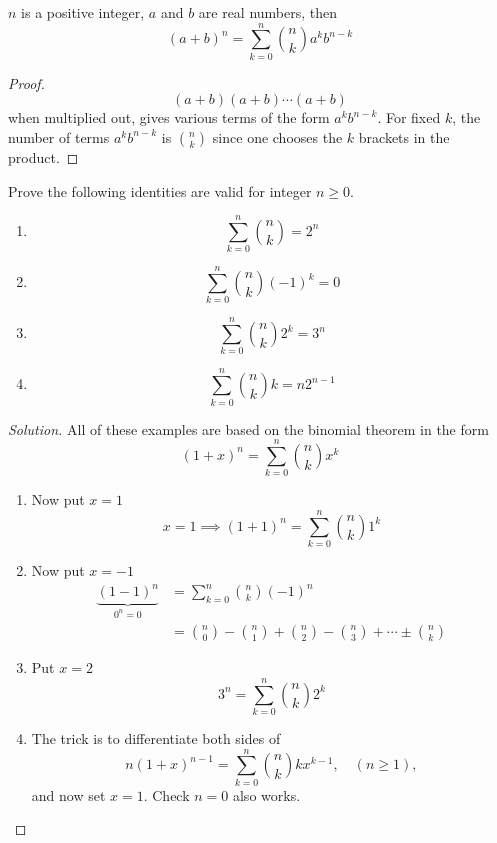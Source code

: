 \documentclass[10pt, a4paper]{article}
\begin{document}
\begin{theorem}
    $n$ is a positive integer, $a$ and $b$ are real numbers, then
    \[
    (a + b) ^ n = \sum_{k = 0}^{n}\binom{n}{k}a ^ {k} b ^ {n - k}
    \]
    \begin{proof}
        \[
        (a + b)(a + b) \dotsi (a + b)
        \]
        when multiplied out, gives various terms of the form $a ^ k b ^ {n - k}$. For fixed $k$, the number of terms $a ^ k b ^ {n - k}$ is $\binom{n}{k}$ since one chooses the $k$ brackets in the product.
    \end{proof}
\end{theorem}

\begin{example}
    Prove the following identities are valid for integer $n \geq 0$.
    \begin{enumerate}[label = C\arabic*]
        \item
        \[
        \sum_{k = 0}^n\binom{n}{k} = 2 ^ n
        \]
        \item
        \[
        \sum_{k = 0}^n\binom{n}{k}(-1) ^ k = 0
        \]
        \item 
        \[
        \sum_{k = 0}^n\binom{n}{k}2 ^ k = 3 ^ n
        \]
        \item
        \[
        \sum_{k = 0}^n\binom{n}{k}k = n2 ^ {n - 1}
        \]
    \end{enumerate}

    \begin{proof}[Solution]\renewcommand{\qedsymbol}{}
        All of these examples are based on the binomial theorem in the form
        \[
        (1 + x) ^ n = \sum_{k = 0}^{n}\binom{n}{k}x ^ k
        \]
        \begin{enumerate}[label = C\arabic*]
        \item Now put $x = 1$
        \[
        x = 1 \implies (1 + 1) ^ n = \sum_{k = 0}^{n}\binom{n}{k}1 ^ k
        \]
        \item Now put $x = -1$
        \begin{align*}
        \underbrace{(1 - 1) ^ n}_{0 ^ n = 0} &= \sum_{k = 0}^{n}\binom{n}{k}(-1) ^ n \\
        &= \binom{n}{0} - \binom{n}{1} + \binom{n}{2} - \binom{n}{3} + \dotsi \pm \binom{n}{k}
        \end{align*}
        \item Put $x = 2$
        \[
        3 ^ n = \sum_{k = 0}^{n}\binom{n}{k}2 ^ k
        \]
        \item The trick is to differentiate both sides of 
        \[
        n(1 + x) ^ {n - 1} = \sum_{k = 0}^{n}\binom{n}{k}kx ^ {k - 1},\quad(n \geq 1),
        \]
        and now set $x = 1$. Check $n = 0$ also works.
        \end{enumerate}
    \end{proof}
\end{example}
\end{document}
